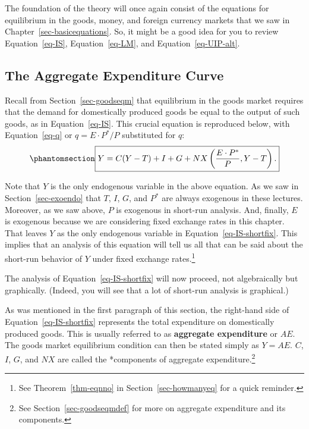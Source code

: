 \documentclass[
  letterpaper,
]{book}
\theoremstyle{plain}
\theoremstyle{remark}
\begin{document}
The foundation of the theory will once again consist of the equations
for equilibrium in the goods, money, and foreign currency markets that
we saw in Chapter~\ref{sec-basicequations}. So, it might be a good idea
for you to review Equation~\ref{eq-IS}, Equation~\ref{eq-LM}, and
Equation~\ref{eq-UIP-alt}.

\subsection{The Aggregate Expenditure Curve}\label{sec-aecurve}


Recall from Section~\ref{sec-goodseqm} that equilibrium in the goods
market requires that the demand for domestically produced goods be equal
to the output of such goods, as in Equation~\ref{eq-IS}. This crucial
equation is reproduced below, with Equation~\ref{eq-q} or
\(q=E\cdot P^*/P\) substituted for \(q\):
\begin{equation}\phantomsection\label{eq-IS-shortfix}{
\fbox{$\displaystyle Y=C(Y-T)+I+G+NX\left(\frac{E\cdot P^*}{P},Y-T\right).$}
}\end{equation}

Note that \(Y\) is the only endogenous variable in the above equation.
As we saw in Section~\ref{sec-exoendo} that \(T\), \(I\), \(G\), and
\(P^*\) are always exogenous in these lectures. Moreover, as we saw
above, \(P\) is exogenous in short-run analysis. And, finally, \(E\) is
exogenous because we are considering fixed exchange rates in this
chapter. That leaves \(Y\) as the only endogenous variable in
Equation~\ref{eq-IS-shortfix}. This implies that an analysis of this
equation will tell us all that can be said about the short-run behavior
of \(Y\) under fixed exchange rates.\footnote{See
  Theorem~\ref{thm-eqnno} in Section~\ref{sec-howmanyeq} for a quick
  reminder.}

The analysis of Equation~\ref{eq-IS-shortfix} will now proceed, not
algebraically but graphically. (Indeed, you will see that a lot of
short-run analysis is graphical.)

As was mentioned in the first paragraph of this section, the right-hand
side of Equation~\ref{eq-IS-shortfix} represents the total expenditure
on domestically produced goods. This is usually referred to as
\textbf{aggregate expenditure} or \(AE\).
The goods market equilibrium condition can then be stated simply as
\(Y=AE\). \(C\), \(I\), \(G\), and \(NX\) are called the *components of
aggregate expenditure.\footnote{See Section~\ref{sec-goodseqmdef} for
  more on aggregate expenditure and its components.}
\end{document}
